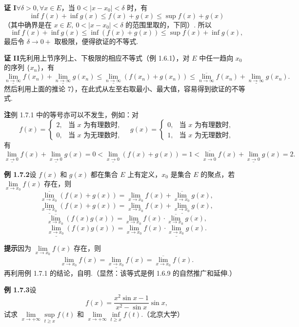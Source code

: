 \documentclass[UTF8, 12pt, fontset=fandol, oneside]{ctexart}
\begin{document}
\noindent\textbf{证 I}\quad $\forall \delta>0,\forall x\in E$，当 $0<|x-x_0|<\delta$ 时，有
\[
  \inf f(x)+\inf g(x)\le f(x)+g(x)\le \sup f(x)+g(x)
\]
（其中确界是在 $x\in E,\ 0<|x-x_0|<\delta$ 的范围里取的，下同）. 所以
\[
  \inf f(x)+\inf g(x)\le \inf(f(x)+g(x))\le \sup f(x)+\inf g(x),
\]
最后令 $\delta\to0+$ 取极限，便得欲证的不等式.

\noindent\textbf{证 II}\quad 先利用上节序列上、下极限的相应不等式（例 1.6.1），对 $E$ 中任一趋向 $x_0$ 的序列 $\{x_n\}$，有
\[
  \underline{\lim_{n\to\infty}}f(x_n)+\underline{\lim_{n\to\infty}}g(x_n)
  \le \underline{\lim_{n\to\infty}}(f(x_n)+g(x_n))
  \le \overline{\lim_{n\to\infty}}f(x_n)+\underline{\lim_{n\to\infty}}g(x_n).
\]
然后利用上面的推论 7），在此式从左至右取最小、最大值，容易得到欲证的不等式.

\noindent\textbf{注}\quad 例 1.7.1 中的等号亦可以不发生，例如：对
\[
  f(x)=
  \begin{cases}
    2, & \text{当 }x\text{ 为有理数时},\\
    0, & \text{当 }x\text{ 为无理数时},
  \end{cases}
  \quad
  g(x)=
  \begin{cases}
    0, & \text{当 }x\text{ 为有理数时},\\
    1, & \text{当 }x\text{ 为无理数时},
  \end{cases}
\]
有
\[
  \underline{\lim_{x\to0}}f(x)+\underline{\lim_{x\to0}}g(x)=0
  <\underline{\lim_{x\to0}}(f(x)+g(x))=1
  <\overline{\lim_{x\to0}}f(x)+\underline{\lim_{x\to0}}g(x)=2.
\]

\noindent\textbf{例 1.7.2}\quad 设 $f(x)$ 和 $g(x)$ 都在集合 $E$ 上有定义，$x_0$ 是集合 $E$ 的聚点，若 $\lim\limits_{x\to x_0}f(x)$ 存在，则
\[
  \overline{\lim_{x\to x_0}}(f(x)+g(x))
  =\lim_{x\to x_0}f(x)+\overline{\lim_{x\to x_0}}g(x),
\]
\[
  \underline{\lim_{x\to x_0}}(f(x)+g(x))
  =\lim_{x\to x_0}f(x)+\underline{\lim_{x\to x_0}}g(x),
\]
\[
  \overline{\lim_{x\to x_0}}(f(x)g(x))
  =\lim_{x\to x_0}f(x)\cdot\overline{\lim_{x\to x_0}}g(x),
\]
\[
  \underline{\lim_{x\to x_0}}(f(x)g(x))
  =\lim_{x\to x_0}f(x)\cdot\underline{\lim_{x\to x_0}}g(x).
\]

\noindent\textbf{提示}\quad 因为 $\lim\limits_{x\to x_0}f(x)$ 存在，则
\[
  \lim_{x\to x_0}f(x)
  =\underline{\lim_{x\to x_0}}f(x)
  =\overline{\lim_{x\to x_0}}f(x).
\]
再利用例 1.7.1 的结论，自明.（显然：该等式是例 1.6.9 的自然推广和延伸.）

\noindent\textbf{例 1.7.3}\quad 设
\[
  f(x)=\frac{x^2\sin x-1}{x^2-\sin x}\sin x,
\]
试求 $\lim\limits_{x\to+\infty}\sup\limits_{t\ge x}f(t)$ 和 $\lim\limits_{x\to+\infty}\inf\limits_{t\ge x}f(t)$.（北京大学）
\end{document}
